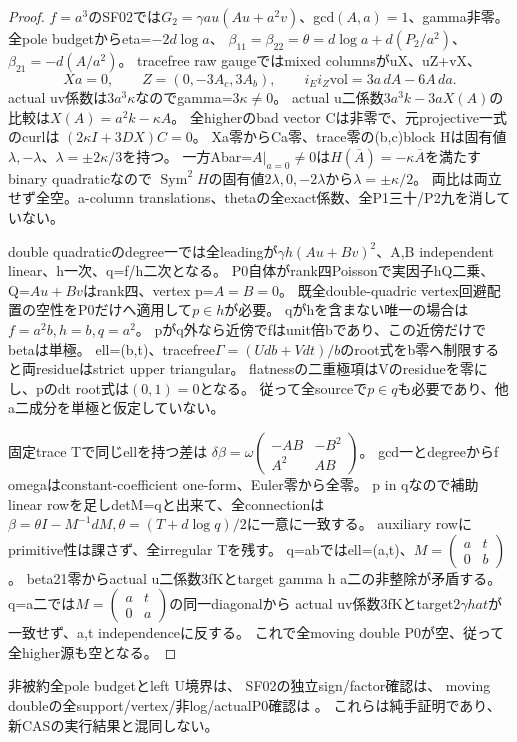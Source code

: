 \documentclass[a4paper,11pt]{ltjsarticle}
\theoremstyle{definition}
\begin{document}
\begin{proof}
$f=a^3$のSF02では$G_2=\gamma a u(Au+a^2v)$、gcd$(A,a)=1$、gamma非零。
全pole budgetからeta=$-2d\log a$、
$\beta_{11}=\beta_{22}=\theta=d\log a+d(P_2/a^2)$、$\beta_{21}=-d(A/a^2)$。
tracefree raw gaugeではmixed columnsがuX、uZ+vX、
\[
 Xa=0,\qquad Z=(0,-3A_c,3A_b),\qquad
 i_Ei_Z\mathrm{vol}=3a\,dA-6A\,da.
\]
actual uv係数は$3a^3\kappa$なのでgamma=$3\kappa\ne0$。
actual u二係数$3a^3k-3aX(A)$の比較は$X(A)=a^2k-\kappa A$。
全higherのbad vector Cは非零で、元projective一式のcurlは
$(2\kappa I+3DX)C=0$。
Xa零からCa零、trace零の(b,c)block Hは固有値$\lambda,-\lambda$、$\lambda=\pm2\kappa/3$を持つ。
一方Abar=$A|_{a=0}\ne0$は$H(\overline A)=-\kappa\overline A$を満たすbinary quadraticなので
$\operatorname{Sym}^2H$の固有値$2\lambda,0,-2\lambda$から$\lambda=\pm\kappa/2$。
両比は両立せず全空。a-column translations、thetaの全exact係数、全P1三十/P2九を消していない。

double quadraticのdegree一では全leadingが$\gamma h(Au+Bv)^2$、A,B independent linear、h一次、q=f/h二次となる。
P0自体がrank四Poissonで実因子hQ二乗、Q=$Au+Bv$はrank四、vertex p=$A=B=0$。
既全double-quadric vertex回避配置の空性をP0だけへ適用して$p\in h$が必要。
qがhを含まない唯一の場合は$f=a^2b,h=b,q=a^2$。
pがq外なら近傍でfはunit倍bであり、この近傍だけでbetaは単極。
ell=(b,t)、tracefree$\Gamma=(Udb+Vdt)/b$のroot式をb零へ制限すると両residueはstrict upper triangular。
flatnessの二重極項はVのresidueを零にし、pのdt root式は$(0,1)=0$となる。
従って全sourceで$p\in q$も必要であり、他a二成分を単極と仮定していない。

固定trace Tで同じellを持つ差は
$\delta\beta=\omega\left(\begin{smallmatrix}-AB&-B^2\\A^2&AB\end{smallmatrix}\right)$。
gcd一とdegreeからf omegaはconstant-coefficient one-form、Euler零から全零。
p in qなので補助linear rowを足しdetM=qと出来て、全connectionは
$\beta=\theta I-M^{-1}dM,\theta=(T+d\log q)/2$に一意に一致する。
auxiliary rowにprimitive性は課さず、全irregular Tを残す。
q=abではell=(a,t)、$M=\left(\begin{smallmatrix}a&t\\0&b\end{smallmatrix}\right)$。
beta21零からactual u二係数3fKとtarget gamma h a二の非整除が矛盾する。
q=a二では$M=\left(\begin{smallmatrix}a&t\\0&a\end{smallmatrix}\right)$の同一diagonalから
actual uv係数3fKとtarget$2\gamma h a t$が一致せず、a,t independenceに反する。
これで全moving double P0が空、従って全higher源も空となる。
\end{proof}
非被約全pole budgetとleft U境界は、
SF02の独立sign/factor確認は、
moving doubleの全support/vertex/非log/actualP0確認は
。
これらは純手証明であり、新CASの実行結果と混同しない。
\end{document}
